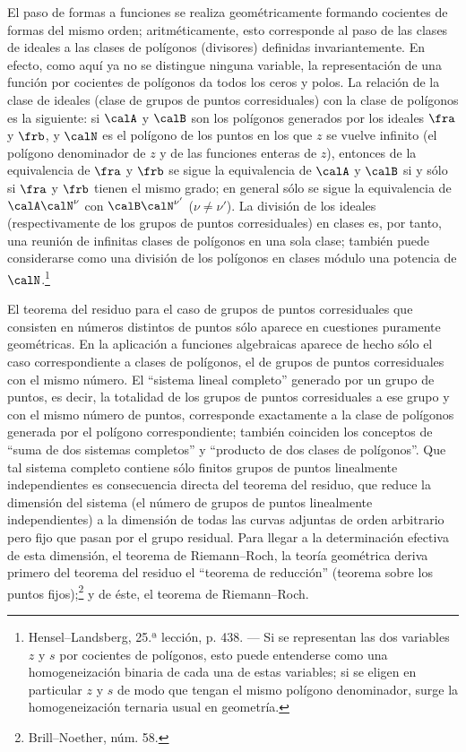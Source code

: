 \documentclass[11pt]{article}
\begin{document}
El paso de formas a funciones se realiza geométricamente formando cocientes de formas del mismo orden; aritméticamente, esto corresponde al paso de las clases de ideales a las clases de polígonos (divisores) definidas invariantemente. En efecto, como aquí ya no se distingue ninguna variable, la representación de una función por cocientes de polígonos da todos los ceros y polos. La relación de la clase de ideales (clase de grupos de puntos corresiduales) con la clase de polígonos es la siguiente: si \(\calA\) y \(\calB\) son los polígonos generados por los ideales \(\fra\) y \(\frb\), y \(\calN\) es el polígono de los puntos en los que \(z\) se vuelve infinito (el polígono denominador de \(z\) y de las funciones enteras de \(z\)), entonces de la equivalencia de \(\fra\) y \(\frb\) se sigue la equivalencia de \(\calA\) y \(\calB\) si y sólo si \(\fra\) y \(\frb\) tienen el mismo grado; en general sólo se sigue la equivalencia de \(\calA\calN^\nu\) con \(\calB\calN^{\nu'}\) (\(\nu\ne\nu'\)). La división de los ideales (respectivamente de los grupos de puntos corresiduales) en clases es, por tanto, una reunión de infinitas clases de polígonos en una sola clase; también puede considerarse como una división de los polígonos en clases módulo una potencia de \(\calN\).\footnote{Hensel--Landsberg, 25.ª lección, p. 438. --- Si se representan las dos variables \(z\) y \(s\) por cocientes de polígonos, esto puede entenderse como una homogeneización binaria de cada una de estas variables; si se eligen en particular \(z\) y \(s\) de modo que tengan el mismo polígono denominador, surge la homogeneización ternaria usual en geometría.}

El teorema del residuo para el caso de grupos de puntos corresiduales que consisten en números distintos de puntos sólo aparece en cuestiones puramente geométricas. En la aplicación a funciones algebraicas aparece de hecho sólo el caso correspondiente a clases de polígonos, el de grupos de puntos corresiduales con el mismo número. El ``sistema lineal completo'' generado por un grupo de puntos, es decir, la totalidad de los grupos de puntos corresiduales a ese grupo y con el mismo número de puntos, corresponde exactamente a la clase de polígonos generada por el polígono correspondiente; también coinciden los conceptos de ``suma de dos sistemas completos'' y ``producto de dos clases de polígonos''. Que tal sistema completo contiene sólo finitos grupos de puntos linealmente independientes es consecuencia directa del teorema del residuo, que reduce la dimensión del sistema (el número de grupos de puntos linealmente independientes) a la dimensión de todas las curvas adjuntas de orden arbitrario pero fijo que pasan por el grupo residual. Para llegar a la determinación efectiva de esta dimensión, el teorema de Riemann--Roch, la teoría geométrica deriva primero del teorema del residuo el ``teorema de reducción'' (teorema sobre los puntos fijos);\footnote{Brill--Noether, núm. 58.} y de éste, el teorema de Riemann--Roch.
\end{document}
